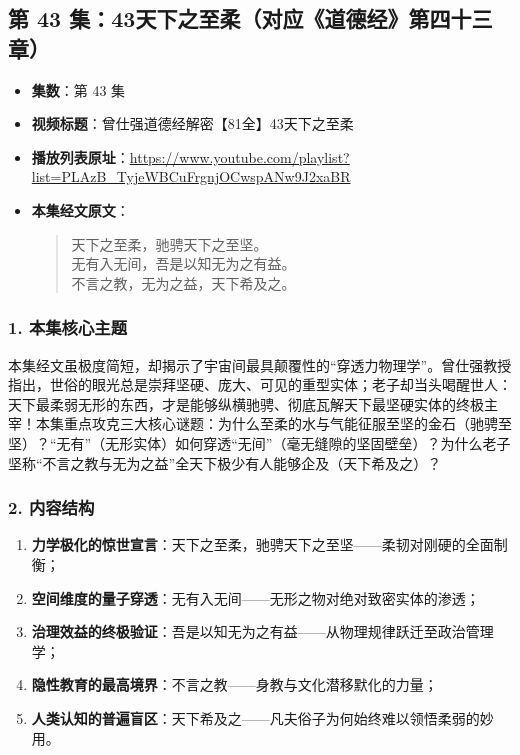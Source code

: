 \clearpage

\subsection{第 43 集：43天下之至柔（对应《道德经》第四十三章）}
\label{sec:ep43}

\begin{itemize}
    \item \textbf{集数}：第 43 集
    \item \textbf{视频标题}：曾仕强道德经解密【81全】43天下之至柔
    \item \textbf{播放列表原址}：\url{https://www.youtube.com/playlist?list=PLAzB_TyjeWBCuFrgnjOCwspANw9J2xaBR}
    \item \textbf{本集经文原文}：
    \begin{quote}\kaishu
    天下之至柔，驰骋天下之至坚。\\
    无有入无间，吾是以知无为之有益。\\
    不言之教，无为之益，天下希及之。
    \end{quote}
\end{itemize}

\subsubsection{1. 本集核心主题}
本集经文虽极度简短，却揭示了宇宙间最具颠覆性的“穿透力物理学”。曾仕强教授指出，世俗的眼光总是崇拜坚硬、庞大、可见的重型实体；老子却当头喝醒世人：天下最柔弱无形的东西，才是能够纵横驰骋、彻底瓦解天下最坚硬实体的终极主宰！本集重点攻克三大核心谜题：为什么至柔的水与气能征服至坚的金石（驰骋至坚）？“无有”（无形实体）如何穿透“无间”（毫无缝隙的坚固壁垒）？为什么老子坚称“不言之教与无为之益”全天下极少有人能够企及（天下希及之）？

\subsubsection{2. 内容结构}
\begin{enumerate}
    \item \textbf{力学极化的惊世宣言}：天下之至柔，驰骋天下之至坚——柔韧对刚硬的全面制衡；
    \item \textbf{空间维度的量子穿透}：无有入无间——无形之物对绝对致密实体的渗透；
    \item \textbf{治理效益的终极验证}：吾是以知无为之有益——从物理规律跃迁至政治管理学；
    \item \textbf{隐性教育的最高境界}：不言之教——身教与文化潜移默化的力量；
    \item \textbf{人类认知的普遍盲区}：天下希及之——凡夫俗子为何始终难以领悟柔弱的妙用。
\end{enumerate}


